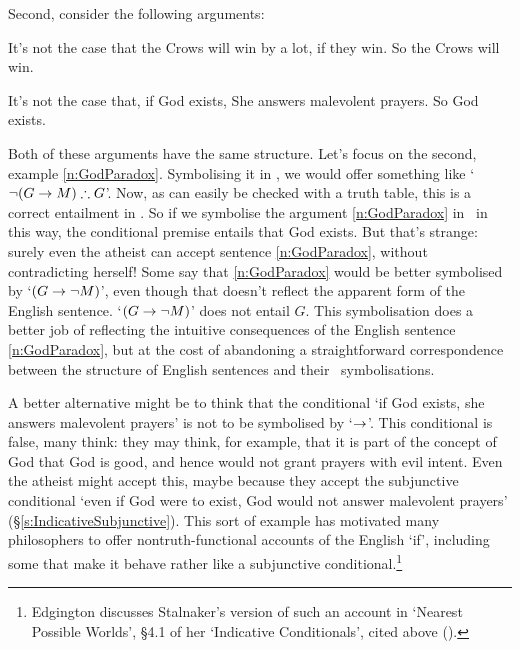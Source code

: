 Second, consider the following arguments:
	\begin{earg}
	\item[\ex{crows}]  It’s not the case that the Crows will win by a lot, if they win.
So the Crows will win.
		\item[\ex{n:GodParadox}] It's not the case that, if God exists, She answers malevolent prayers. So God exists.
	\end{earg}
Both of these arguments have the same structure. Let's focus on the second, example \ref{n:GodParadox}. Symbolising it in \TFL, we would offer something like `$\neg (G \rightarrow M) \mathrel{\therefore} G$'. Now, as can easily be checked with a truth table, this is a correct entailment in \TFL. So if we symbolise the argument \ref{n:GodParadox} in \TFL\ in this way, the conditional premise entails that God exists. But that's strange: surely even the atheist can accept sentence \ref{n:GodParadox}, without contradicting herself! Some say that \ref{n:GodParadox} would be better symbolised by `$(G \rightarrow \neg M)$', even though that doesn't reflect the apparent form of the English sentence. `$(G \rightarrow \neg M)$' does not entail $G$. This symbolisation does a better job of reflecting the intuitive consequences of the English sentence \ref{n:GodParadox}, but at the cost of abandoning a straightforward correspondence between the structure of English sentences and their \TFL\ symbolisations. 

A better alternative might be to think that the conditional `if God exists, she answers malevolent prayers' is not to be symbolised by `$\rightarrow$'. This conditional is false, many think: they may think, for example, that it is part of the concept of God that God is good, and hence would not grant prayers with evil intent. Even the atheist might accept this, maybe because they accept the subjunctive conditional `even if God were to exist, God would not answer malevolent prayers' (§\ref{s:IndicativeSubjunctive}). This sort of example has motivated many philosophers to offer nontruth-functional accounts of the English `if', including some that make it behave rather like a subjunctive conditional.\footnote{Edgington discusses Stalnaker's version of such an account in `Nearest Possible Worlds', §4.1 of her `Indicative Conditionals', cited above ().} 


